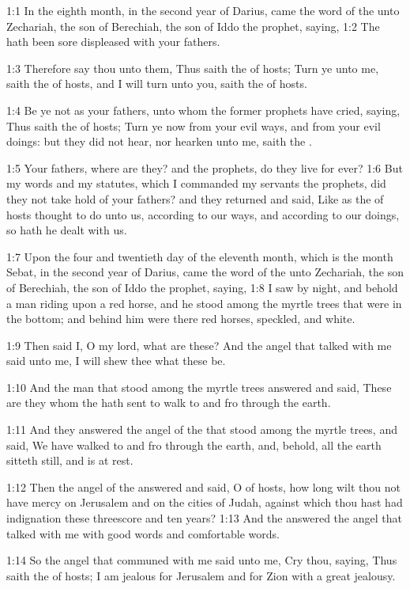 

1:1 In the eighth month, in the second year of Darius, came the word
of the \LORD unto Zechariah, the son of Berechiah, the son of Iddo the
prophet, saying, 1:2 The \LORD hath been sore displeased with your
fathers.

1:3 Therefore say thou unto them, Thus saith the \LORD of hosts; Turn
ye unto me, saith the \LORD of hosts, and I will turn unto you, saith
the \LORD of hosts.

1:4 Be ye not as your fathers, unto whom the former prophets have
cried, saying, Thus saith the \LORD of hosts; Turn ye now from your
evil ways, and from your evil doings: but they did not hear, nor
hearken unto me, saith the \LORD.

1:5 Your fathers, where are they? and the prophets, do they live for
ever?  1:6 But my words and my statutes, which I commanded my servants
the prophets, did they not take hold of your fathers? and they
returned and said, Like as the \LORD of hosts thought to do unto us,
according to our ways, and according to our doings, so hath he dealt
with us.

1:7 Upon the four and twentieth day of the eleventh month, which is
the month Sebat, in the second year of Darius, came the word of the
\LORD unto Zechariah, the son of Berechiah, the son of Iddo the
prophet, saying, 1:8 I saw by night, and behold a man riding upon a
red horse, and he stood among the myrtle trees that were in the
bottom; and behind him were there red horses, speckled, and white.

1:9 Then said I, O my lord, what are these? And the angel that talked
with me said unto me, I will shew thee what these be.

1:10 And the man that stood among the myrtle trees answered and said,
These are they whom the \LORD hath sent to walk to and fro through the
earth.

1:11 And they answered the angel of the \LORD that stood among the
myrtle trees, and said, We have walked to and fro through the earth,
and, behold, all the earth sitteth still, and is at rest.

1:12 Then the angel of the \LORD answered and said, O \LORD of hosts,
how long wilt thou not have mercy on Jerusalem and on the cities of
Judah, against which thou hast had indignation these threescore and
ten years?  1:13 And the \LORD answered the angel that talked with me
with good words and comfortable words.

1:14 So the angel that communed with me said unto me, Cry thou,
saying, Thus saith the \LORD of hosts; I am jealous for Jerusalem and
for Zion with a great jealousy.

